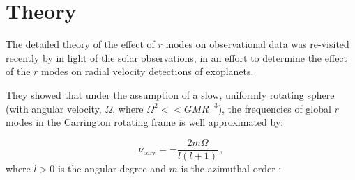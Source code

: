 



%
%



\section{Theory}\label{sec:r-mode_theory}

The detailed theory of the effect of $r$ modes on observational data was re-visited recently by \citet{lanza_sectoral_2019} in light of the solar observations, in an effort to determine the effect of the $r$ modes on radial velocity detections of exoplanets.

They showed that under the assumption of a slow, uniformly rotating sphere (with angular velocity, $\Omega$, where $\Omega^2 << GMR^{-3}$), the frequencies of global $r$ modes in the Carrington rotating frame is well approximated by:

\begin{equation}
\nu_{carr} = - \frac{2m\Omega}{l(l + 1)} \, ,
\label{eq:dispersion_rel}
\end{equation}
%
where $l > 0$ is the angular degree and $m$ is the azimuthal order \citep{loptien_global-scale_2018, lanza_sectoral_2019}:

